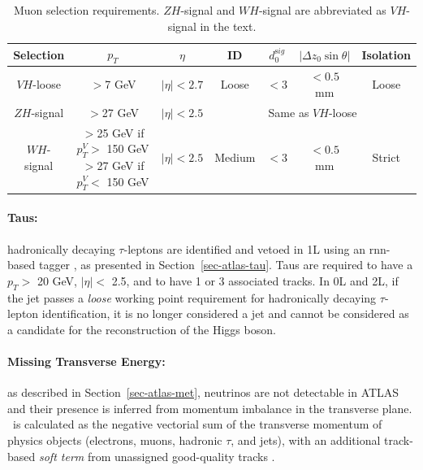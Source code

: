 \begin{table}[!htbp]
    \begin{center}
        \begin{tabular}{ccccccc} \hline \hline
          Selection & $p_T$ & $\eta$ & ID & $d_{0}^{\mathrm sig}$  & $|\Delta{z_{0}}\sin\theta|$ & Isolation \\ \hline
          $VH$-loose & $>$7 GeV & $|\eta|< 2.7$ & Loose & $ <3$ & $<0.5$ mm & Loose \\ %
          $ZH$-signal & $>$27 GeV & $|\eta| < 2.5$ & \multicolumn{4}{c}{Same as $VH$-loose} \\
          $WH$-signal & \makecell[c]{$>$25 GeV if $p_T^V>$ 150 GeV\\ $>$27 GeV if $p_T^V<$ 150 GeV} & $|\eta|< 2.5$ & Medium & $ <3$ & $<0.5$ mm & Strict \\
          \hline\hline
        \end{tabular}
      \caption{Muon selection requirements. $ZH$-signal and $WH$-signal are abbreviated as $VH$-signal in the text.} 
      \label{tbl:muonOb}
    \end{center}
  \end{table}
  
\paragraph{Taus:} hadronically decaying $\tau$-leptons are identified and vetoed in 1L using an \gls{rnn}-based tagger \cite{ATL-PHYS-PUB-2019-033}, as presented in Section~\ref{sec-atlas-tau}. Taus are required to have a $p_T >$ 20 GeV, $|\eta| <$ 2.5, and to have 1 or 3 associated tracks. In 0L and 2L, if the jet passes a \textit{loose} working point requirement for hadronically decaying $\tau$-lepton identification, it is no longer considered a jet and cannot be considered as a candidate for the reconstruction of the Higgs boson. 

\paragraph{Missing Transverse Energy:} as described in Section~\ref{sec-atlas-met}, neutrinos are not detectable in ATLAS and their presence is inferred from momentum imbalance in the transverse plane. \etm\ is calculated as the negative vectorial sum of the transverse momentum of physics objects (electrons, muons, hadronic $\tau$, and jets), with an additional track-based \textit{soft term} from unassigned good-quality tracks \cite{ATLASmetReco}. 

